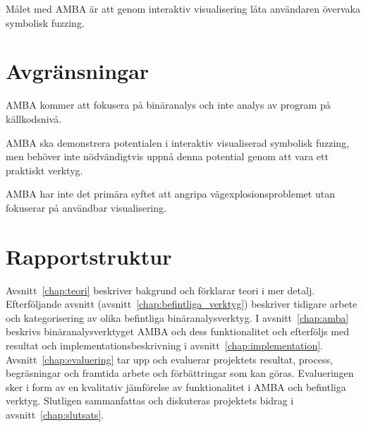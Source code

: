 Målet med AMBA är att genom interaktiv visualisering låta användaren övervaka
symbolisk fuzzing.

\section{Avgränsningar}

AMBA kommer att fokusera på binäranalys och inte analys av program på
källkodsnivå.

AMBA ska demonstrera potentialen i interaktiv visualiserad symbolisk fuzzing,
men behöver inte nödvändigtvis uppnå denna potential genom att vara ett
praktiskt verktyg.

AMBA har inte det primära syftet att angripa vägexplosionsproblemet utan
fokuserar på användbar visualisering.

\section{Rapportstruktur}

Avsnitt~\ref{chap:teori} beskriver bakgrund och förklarar teori i mer detalj.
Efterföljande avsnitt (avsnitt~\ref{chap:befintliga_verktyg}) beskriver
tidigare arbete och kategorisering av olika befintliga binäranalysverktyg. I
avsnitt~\ref{chap:amba} beskrivs binäranalysverktyget AMBA och dess
funktionalitet och efterföljs med resultat och implementationsbeskrivning i
avsnitt~\ref{chap:implementation}. Avsnitt~\ref{chap:evaluering} tar upp och
evaluerar projektets resultat, process, begräsningar och framtida arbete och
förbättringar som kan göras. Evalueringen sker i form av en kvalitativ
jämförelse av funktionalitet i AMBA och befintliga verktyg. Slutligen
sammanfattas och diskuteras projektets bidrag i avsnitt~\ref{chap:slutsats}.
